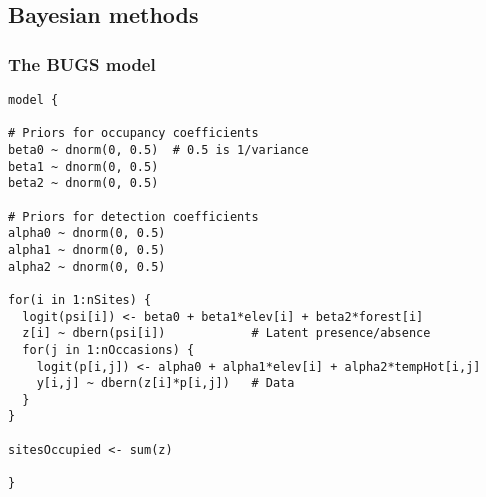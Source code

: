 \documentclass[color=usenames,dvipsnames]{beamer}\usepackage[]{graphicx}\usepackage[]{xcolor}
\makeatletter
\newenvironment{kframe}{%
 \def\at@end@of@kframe{}%
 \ifinner\ifhmode%
  \def\at@end@of@kframe{\end{minipage}}%
  \begin{minipage}{\columnwidth}%
 \fi\fi%
 \def\FrameCommand##1{\hskip\@totalleftmargin \hskip-\fboxsep
 \colorbox{shadecolor}{##1}\hskip-\fboxsep
     \hskip-\linewidth \hskip-\@totalleftmargin \hskip\columnwidth}%
 \MakeFramed {\advance\hsize-\width
   \@totalleftmargin\z@ \linewidth\hsize
   \@setminipage}}%
 {\par\unskip\endMakeFramed%
 \at@end@of@kframe}
\newenvironment{knitrout}{}{} %
\makeatother
\begin{document}




\subsection{Bayesian methods}



\begin{frame}[fragile]
  \frametitle{The BUGS model}
\begin{knitrout}\scriptsize
{}\color{fgcolor}\begin{kframe}
\begin{verbatim}
model {

# Priors for occupancy coefficients
beta0 ~ dnorm(0, 0.5)  # 0.5 is 1/variance
beta1 ~ dnorm(0, 0.5)
beta2 ~ dnorm(0, 0.5)

# Priors for detection coefficients
alpha0 ~ dnorm(0, 0.5)  
alpha1 ~ dnorm(0, 0.5)
alpha2 ~ dnorm(0, 0.5)

for(i in 1:nSites) {
  logit(psi[i]) <- beta0 + beta1*elev[i] + beta2*forest[i]
  z[i] ~ dbern(psi[i])            # Latent presence/absence
  for(j in 1:nOccasions) {
    logit(p[i,j]) <- alpha0 + alpha1*elev[i] + alpha2*tempHot[i,j]
    y[i,j] ~ dbern(z[i]*p[i,j])   # Data
  }
}

sitesOccupied <- sum(z)

}
\end{verbatim}
\end{kframe}
\end{knitrout}
\end{frame}
\end{document}
